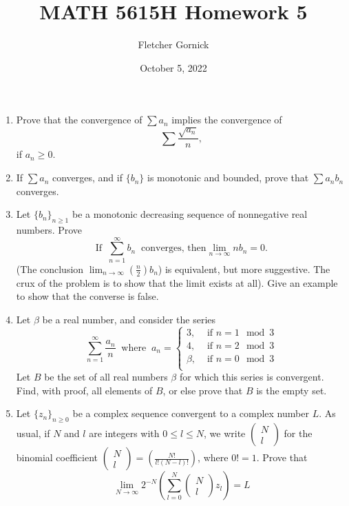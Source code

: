 \documentclass[11pt]{article}
\title{\vspace{-1.0cm}MATH 5615H Homework 5}
\author{Fletcher Gornick}
\date{October 5, 2022}
\begin{document}
 \maketitle
 \begin{enumerate}[leftmargin=0pt, label=\arabic*)]
    \item Prove that the convergence of \(\sum a_n\) implies the convergence of 
      \[\sum \frac{\sqrt{a_n}}{n},\]
      if \(a_n \geq 0\).
      \newpage

    \item If \(\sum a_n\) converges, and if \(\{b_n\}\) is monotonic and bounded, prove that 
      \(\sum a_n b_n\) converges.
      \newpage

    \item Let \(\{b_n\}_{n \geq 1}\) be a monotonic decreasing sequence of nonnegative real numbers.
      Prove \[\text{If} \;\; \sum_{n=1}^{\infty}b_n \;\; \text{converges, then} 
      \lim_{n \to \infty} nb_n = 0.\]
      (The conclusion \(\displaystyle\lim_{n \to \infty} \left(\frac{n}{2}\right)b_n\)) is equivalent,
      but more suggestive.  The crux of the problem is to show that the limit exists at all).  Give an 
      example to show that the converse is false.
      \newpage

    \item Let \(\beta\) be a real number, and consider the series
      \[
        \sum_{n=1}^{\infty}\frac{a_n}{n} \;\; \text{where} \;\; a_n=
        \begin{cases}
          3, &\text{ if } n = 1 \mod 3 \\
          4, &\text{ if } n = 2 \mod 3 \\
          \beta, &\text{ if } n = 0 \mod 3 \\
          
        \end{cases}
      \]
      Let \(B\) be the set of all real numbers \(\beta\) for which this series is convergent.  Find, with 
      proof, all elements of \(B\), or else prove that \(B\) is the empty set.
      \newpage

    \item Let \(\{z_n\}_{n \geq 0}\) be a complex sequence convergent to a complex number \(L\).  As usual, 
      if \(N\) and \(l\) are integers with \(0 \leq l \leq N\), we write 
      \(\begin{pmatrix} N \\ l \end{pmatrix}\) for the binomial coefficient 
      \(\begin{pmatrix} N \\ l \end{pmatrix} = \left( \displaystyle\frac{N!}{l!(N-l)!} \right)\), where 
      \(0!=1\).  Prove that
      \[\lim_{N \to \infty} 2^{-N} \left( \sum_{l=0}^{N} \begin{pmatrix} N \\ l \end{pmatrix} z_l \right) = L\]
 \end{enumerate}
\end{document}
